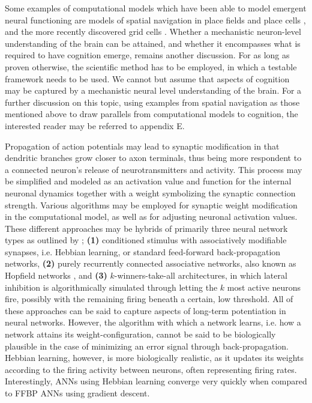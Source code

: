 Some examples of computational models which have been able to model emergent neural functioning are models of spatial navigation in place fields and place cells \citep{OKeefe1976, OKeefe1996}, and the more recently discovered grid cells \citep{Hafting2005}.
Whether a mechanistic neuron-level understanding of the brain can be attained, and whether it encompasses what is required to have cognition emerge, remains another discussion. For as long as proven otherwise, the scientific method has to be employed, in which a testable framework needs to be used. We cannot but assume that aspects of cognition may be captured by a mechanistic neural level understanding of the brain.
For a further discussion on this topic, using examples from spatial navigation as those mentioned above to draw parallels from computational models to cognition, the interested reader may be referred to appendix E.

Propagation of action potentials may lead to synaptic modification in that dendritic branches grow closer to axon terminals, thus being more respondent to a connected neuron's release of neurotransmitters and activity. This process may be simplified and modeled as an activation value and function for the internal neuronal dynamics together with a weight symbolizing the synaptic connection strength. Various algorithms may be employed for synaptic weight modification in the computational model, as well as for adjusting neuronal activation values. These different approaches may be hybrids of primarily three neural network types as outlined by \cite{Rolls1998chpt1};
\textbf{(1)} conditioned stimulus with associatively modifiable synapses, i.e. Hebbian learning, or standard feed-forward back-propagation networks,
\textbf{(2)} purely recurrently connected associative networks, also known as Hopfield networks \citep{Hopfield1982}, and
\textbf{(3)} $k$-winners-take-all architectures, in which lateral inhibition is algorithmically simulated through letting the $k$ most active neurons fire, possibly with the remaining firing beneath a certain, low threshold. 
All of these approaches can be said to capture aspects of long-term potentiation in neural networks. However, the algorithm with which a network learns, i.e. how a network attains its weight-configuration, cannot be said to be biologically plausible in the case of minimizing an error signal through back-propagation. Hebbian learning, however, is more biologically realistic, as it updates its weights according to the firing activity between neurons, often representing firing rates. Interestingly, ANNs using Hebbian learning converge very quickly when compared to FFBP ANNs using gradient descent.

